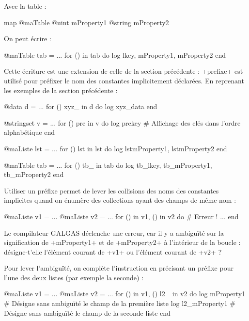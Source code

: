 Avec la table :
\begin{galgas}
map @maTable {
  @uint mProperty1
  @string mProperty2
}
\end{galgas}

On peut écrire :

\begin{galgas}
@maTable tab = ...
for () in tab do
  log lkey, mProperty1, mProperty2
end
\end{galgas}



Cette écriture est une extension de celle de la section précédente : \ggs+prefixe+ est utilisé pour préfixer le nom des constantes implicitement déclarées. En reprenant les exemples de la section précédente :

\begin{galgas}
@data d = ...
for () xyz_ in d do
  log xyz_data
end
\end{galgas}



\begin{galgas}
@stringset v = ...
for () pre in v do
  log prekey # Affichage des clés dans l'ordre alphabétique
end
\end{galgas}


\begin{galgas}
@maListe lst = ...
for () lst in lst do
  log lstmProperty1, lstmProperty2
end
\end{galgas}


\begin{galgas}
@maTable tab = ...
for () tb_ in tab do
  log tb_lkey, tb_mProperty1, tb_mProperty2
end
\end{galgas}

Utiliser un préfixe permet de lever les collisions des noms des constantes implicites quand on énumère des collections ayant des champs de même nom :

\begin{galgas}
@maListe v1 = ...
@maListe v2 = ...
for () in v1, () in v2 do # Erreur !
 ...
end
\end{galgas}

Le compilateur GALGAS déclenche une erreur, car il y a ambiguïté sur la signification de \ggs+mProperty1+ et de \ggs+mProperty2+ à l'intérieur de la boucle : désigne-t'elle l'élément courant de \ggs+v1+ ou l'élément courant de \ggs+v2+ ?

Pour lever l'ambiguïté, on complète l'instruction en précisant un préfixe pour l'une des deux listes (par exemple la seconde) :
\begin{galgas}
@maListe v1 = ...
@maListe v2 = ...
for () in v1, () l2_ in v2 do
  log mProperty1 # Désigne sans ambiguïté le champ de la première liste
  log l2_mProperty1 # Désigne sans ambiguïté le champ de la seconde liste
end
\end{galgas}


